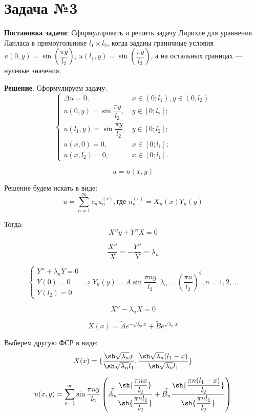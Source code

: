\section{Задача №3}
\textbf{Постановка задачи}:
Сформулировать и решить задачу Дирихле для уравнения Лапласа в прямоугольнике $l_{1} \times l_{2}$, когда заданы граничные условия $u(0, y) = \sin \left( {\dfrac{\pi y}{l_{2}}} \right)$, $u(l_{1}, y) = \sin \left( {\dfrac{\pi y}{l_{2}}} \right)$, а на остальных границах --- нулевые значения.

\textbf{Решение}:
Сформулируем задачу:
$$
\begin{cases}
\Delta u = 0,&\text{$x\in(0;l_{1}), y \in (0, l_{2})$}\\
u(0, y) = \sin{\dfrac{\pi y}{l_{2}}},&\text{$y\in[0;l_{2}]$;}\\
u(l_{1}, y) = \sin{\dfrac{\pi y}{l_{2}}},&\text{$y\in[0;l_{2}]$;}\\
u(x, 0) = 0,&\text{$x\in[0;l_{1}]$;}\\
u(x, l_{2}) = 0,&\text{$x\in[0;l_{1}]$.}
\end{cases}
$$

$$u = u(x, y)$$

Решение будем искать в виде:
$$ u = \sum_{n=1}^{\infty} c_{n} u_{n}^{(r)}, \text{где $u_{n}^{(r)} = X_{n}(x) Y_{n}(y)$}$$

Тогда:
$$ X''y + Y''X = 0 $$

$$ \dfrac{X''}{X} = -\dfrac{Y''}{Y} = \lambda_{n}$$

$$
\begin{cases}
Y'' + \lambda_{n}Y = 0\\
Y(0) = 0\\
Y(l_{2}) = 0
\end{cases}
\Rightarrow Y_{n}(y) = A \sin{\dfrac{\pi ny}{l_{2}}}, \lambda_{n} = \left( \dfrac{\pi n}{l_{2}} \right)^{2}, n = 1, 2, \ldots
$$

$$ X'' - \lambda_{n}X = 0$$

$$ X(x) = \tilde{A}e^{-\sqrt{\lambda_{n}}x} + \tilde{B}e^{\sqrt{\lambda_{n}}x}$$

Выберем другую ФСР в виде:
$$ X(x) = \{ \dfrac{\sh \sqrt{\lambda_{n}}x}{\sh \sqrt{\lambda_{n}}l_{1}}, \dfrac{\sh \sqrt{\lambda_{n}}(l_{1} - x)}{\sh \sqrt{\lambda_{n}}l_{1}} \}$$

$$ u(x, y) = \sum_{n=1}^{\infty} \sin{\dfrac{\pi n y}{l_{2}}} \left( \tilde{\tilde{A_{n}}} \dfrac{\sh{\dfrac{\pi n x}{l_{2}}}}{\sh{\dfrac{\pi n l_{1}}{l_{2}}}} + \tilde{\tilde{B_{n}}} \dfrac{\sh{\dfrac{\pi n (l_{1} - x)}{l_{2}}}}{\sh{\dfrac{\pi n l_{1}}{l_{2}}}} \right) $$

